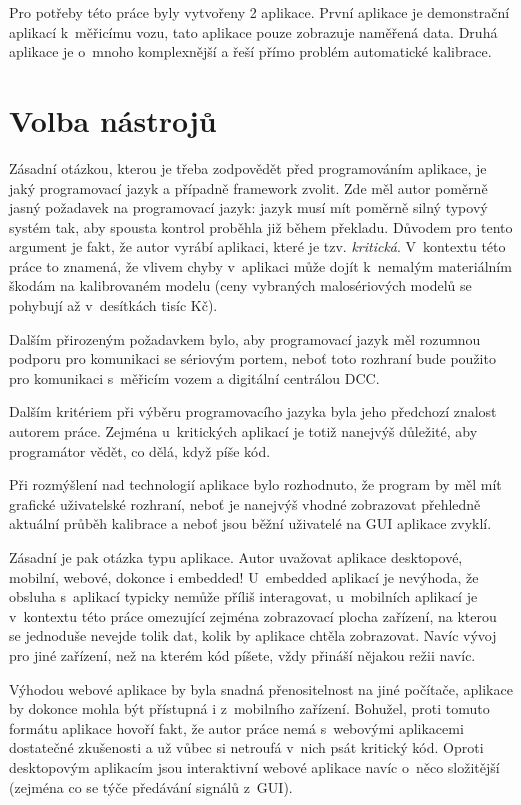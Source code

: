 Pro potřeby této práce byly vytvořeny 2 aplikace. První aplikace je
demonstrační aplikací k~měřicímu vozu, tato aplikace pouze zobrazuje naměřená
data. Druhá aplikace je o~mnoho komplexnější a řeší přímo problém automatické
kalibrace.

\section{Volba nástrojů}
\label{sec:sw-nastroje}

Zásadní otázkou, kterou je třeba zodpovědět před programováním aplikace, je
jaký programovací jazyk a případně framework zvolit. Zde měl autor poměrně
jasný požadavek na programovací jazyk: jazyk musí mít poměrně silný typový
systém tak, aby spousta kontrol proběhla již během překladu. Důvodem pro tento
argument je fakt, že autor vyrábí aplikaci, které je tzv. \textit{kritická}.
V~kontextu této práce to znamená, že vlivem chyby v~aplikaci může dojít
k~nemalým materiálním škodám na kalibrovaném modelu (ceny vybraných
malosériových modelů se pohybují až v~desítkách tisíc Kč).

Dalším přirozeným požadavkem bylo, aby programovací jazyk měl rozumnou podporu
pro komunikaci se sériovým portem, neboť toto rozhraní bude použito pro
komunikaci s~měřicím vozem a digitální centrálou DCC.

Dalším kritériem při výběru programovacího jazyka byla jeho předchozí znalost
autorem práce. Zejména u~kritických aplikací je totiž nanejvýš důležité, aby
programátor vědět, co dělá, když píše kód.

Při rozmýšlení nad technologií aplikace bylo rozhodnuto, že program by měl
mít grafické uživatelské rozhraní, neboť je nanejvýš vhodné zobrazovat přehledně
aktuální průběh kalibrace a neboť jsou běžní uživatelé na GUI aplikace zvyklí.

Zásadní je pak otázka typu aplikace. Autor uvažovat aplikace desktopové,
mobilní, webové, dokonce i embedded! U~embedded aplikací je nevýhoda, že
obsluha s~aplikací typicky nemůže příliš interagovat, u~mobilních aplikací
je v~kontextu této práce omezující zejména zobrazovací plocha zařízení, na
kterou se jednoduše nevejde tolik dat, kolik by aplikace chtěla zobrazovat.
Navíc vývoj pro jiné zařízení, než na kterém kód píšete, vždy přináší nějakou
režii navíc.

Výhodou webové aplikace by byla snadná přenositelnost na jiné počítače,
aplikace by dokonce mohla být přístupná i z~mobilního zařízení. Bohužel, proti
tomuto formátu aplikace hovoří fakt, že autor práce nemá s~webovými aplikacemi
dostatečné zkušenosti a už vůbec si netroufá v~nich psát kritický kód.
Oproti desktopovým aplikacím jsou interaktivní webové aplikace navíc o~něco
složitější (zejména co se týče předávání signálů z~GUI).

